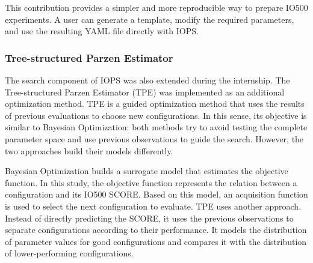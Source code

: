 This contribution provides a simpler and more reproducible way to prepare
IO500 experiments. A user can generate a template, modify the required
parameters, and use the resulting YAML file directly with IOPS.

\subsubsection{Tree-structured Parzen Estimator}
\label{sec:iops-tpe}

The search component of IOPS was also extended during the internship.
The Tree-structured Parzen Estimator (TPE) was implemented as an
additional optimization method.
TPE is a guided optimization method that uses the results of previous
evaluations to choose new configurations. In this sense, its objective is
similar to Bayesian Optimization: both methods try to avoid testing the
complete parameter space and use previous observations to guide the
search.
However, the two approaches build their models differently.

Bayesian Optimization builds a surrogate model that estimates the
objective function. In this study, the objective function represents the
relation between a configuration and its IO500 SCORE. Based on this
model, an acquisition function is used to select the next configuration
to evaluate.
TPE uses another approach. Instead of directly predicting the SCORE, it
uses the previous observations to separate configurations according to
their performance. It models the distribution of parameter values for
good configurations and compares it with the distribution of
lower-performing configurations.


